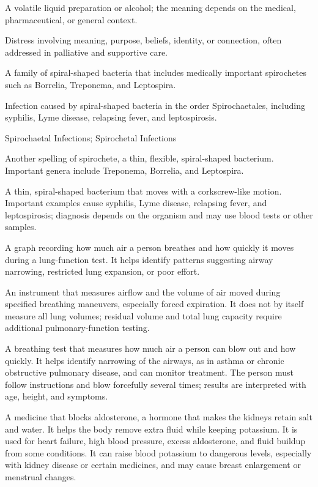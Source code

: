 A volatile liquid preparation or alcohol; the meaning depends on the medical, pharmaceutical, or general context.

 Distress involving meaning, purpose, beliefs, identity, or connection, often addressed in palliative and supportive care.

 A family of spiral-shaped bacteria that includes medically important spirochetes such as Borrelia, Treponema, and Leptospira.

 Infection caused by spiral-shaped bacteria in the order Spirochaetales, including syphilis, Lyme disease, relapsing fever, and leptospirosis.

\synonyms
Spirochaetal Infections; Spirochetal Infections

 Another spelling of spirochete, a thin, flexible, spiral-shaped bacterium. Important genera include Treponema, Borrelia, and Leptospira.

 A thin, spiral-shaped bacterium that moves with a corkscrew-like motion. Important examples cause syphilis, Lyme disease, relapsing fever, and leptospirosis; diagnosis depends on the organism and may use blood tests or other samples.

 A graph recording how much air a person breathes and how quickly it moves during a lung-function test. It helps identify patterns suggesting airway narrowing, restricted lung expansion, or poor effort.

 An instrument that measures airflow and the volume of air moved during specified breathing maneuvers, especially forced expiration. It does not by itself measure all lung volumes; residual volume and total lung capacity require additional pulmonary-function testing.

 A breathing test that measures how much air a person can blow out and how quickly. It helps identify narrowing of the airways, as in asthma or chronic obstructive pulmonary disease, and can monitor treatment. The person must follow instructions and blow forcefully several times; results are interpreted with age, height, and symptoms.

 A medicine that blocks aldosterone, a hormone that makes the kidneys retain salt and water. It helps the body remove extra fluid while keeping potassium. It is used for heart failure, high blood pressure, excess aldosterone, and fluid buildup from some conditions. It can raise blood potassium to dangerous levels, especially with kidney disease or certain medicines, and may cause breast enlargement or menstrual changes.

